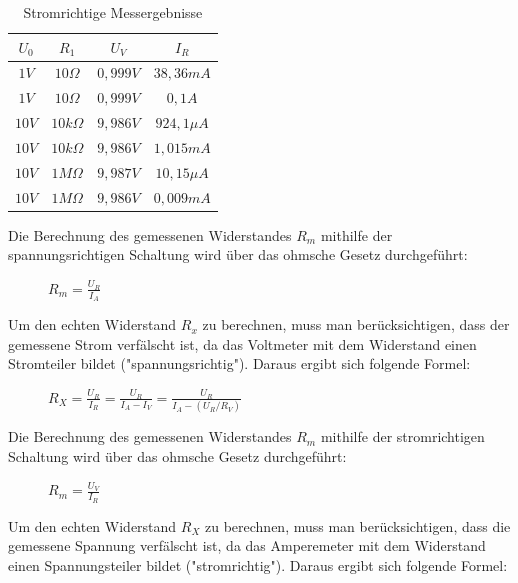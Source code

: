 \documentclass[12pt,a4paper,titlepage]{article}
\begin{document}
\begin{table}[H]
  \centering
  \label{Figure2.5.2}
  \begin{tabular}{|c|c|c|c|}
    \hline
    $U_0$ & $R_1$ & $U_V$ & $I_R$ \\
    \hline
    $1V$ & $10\Omega$ & $0,999V$ & $38,36mA$ \\
    \hline
    $1V$ & $10\Omega$ & $0,999V$ & $0,1A$ \\
    \hline
    $10V$ & $10k\Omega$ & $9,986V$ & $924,1\mu A$ \\
    \hline
    $10V$ & $10k\Omega$ & $9,986V$ & $1,015mA$ \\
    \hline
    $10V$ & $1M\Omega$ & $9,987V$ & $10,15\mu A$ \\
    \hline
    $10V$ & $1M\Omega$ & $9,986V$ & $0,009mA$ \\
    \hline
  \end{tabular}
  \caption{Stromrichtige Messergebnisse}
\end{table}

\noindent Die Berechnung des gemessenen Widerstandes $R_m$ mithilfe der spannungsrichtigen Schaltung wird über das ohmsche Gesetz durchgeführt:

\begin{figure}[H]
  \centering
  \label{Figure2.5.3}
  $R_m = \frac{U_R}{I_A}$
\end{figure}

\noindent Um den echten Widerstand $R_x$ zu berechnen, muss man berücksichtigen, dass der gemessene Strom verfälscht ist, da das Voltmeter mit dem Widerstand einen Stromteiler bildet ("spannungsrichtig"). Daraus ergibt sich folgende Formel:

\begin{figure}[H]
  \centering
  \label{Figure2.5.4}
  $R_X = \frac{U_R}{I_R} = \frac{U_R}{I_A-I_V} = \frac{U_R}{I_A-(U_R/R_V)}$
\end{figure}

\noindent Die Berechnung des gemessenen Widerstandes $R_m$ mithilfe der stromrichtigen Schaltung wird über das ohmsche Gesetz durchgeführt:

\begin{figure}[H]
  \centering
  \label{Figure2.5.5}
  $R_m = \frac{U_V}{I_R}$
\end{figure}

\noindent Um den echten Widerstand $R_X$ zu berechnen, muss man berücksichtigen, dass die gemessene Spannung verfälscht ist, da das Amperemeter mit dem Widerstand einen Spannungsteiler bildet ("stromrichtig"). Daraus ergibt sich folgende Formel:
\end{document}
